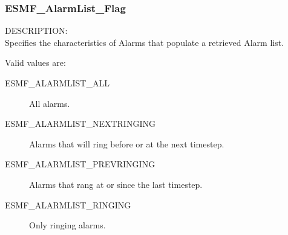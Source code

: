 
\subsubsection{ESMF\_AlarmList\_Flag}

{\sf DESCRIPTION:\\}
Specifies the characteristics of Alarms that populate
a retrieved Alarm list.

Valid values are:
\begin{description}

\item [ESMF\_ALARMLIST\_ALL] 
      All alarms.

\item [ESMF\_ALARMLIST\_NEXTRINGING] 
      Alarms that will ring before or at the next timestep.

\item [ESMF\_ALARMLIST\_PREVRINGING] 
      Alarms that rang at or since the last timestep.

\item [ESMF\_ALARMLIST\_RINGING] 
      Only ringing alarms.

\end{description}

